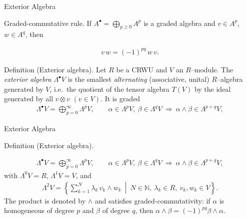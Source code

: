 
\date{24 October 2025}



\begin{frame}
  \cmctitleframe
\end{frame}

\begin{frame}{Exterior Algebra}

\begin{block}{Graded-commutative rule.} If $A^\bullet=\bigoplus_{p\ge 0}A^p$ is a graded algebra and $v\in A^p$, $w\in A^q$, then

\begin{align*}
v\,w = (-1)^{pq}\,w\,v.
\end{align*}
\end{block}

\vspace{-0.3cm}
\begin{block}{Definition (Exterior algebra).}
Let $R$ be a CRWU and $V$ an $R$–module. The \emph{exterior algebra} $\Lambda^\bullet V$ is the smallest \emph{alternating} (associative, unital) $R$–algebra generated by $V$, i.e.\ the quotient of the tensor algebra $T(V)$ by the ideal generated by all $v\otimes v$ $(v\in V)$.
It is graded
\begin{align*}
\Lambda^\bullet V=\bigoplus_{p=0}^\infty \Lambda^p V,\qquad
\alpha\in\Lambda^p V,\ \beta\in\Lambda^q V \ \Longrightarrow\ \alpha\wedge\beta\in\Lambda^{p+q}V,
\end{align*}

\end{block}
\end{frame}

\begin{frame}{Exterior Algebra}

\begin{block}{Definition (Exterior algebra).}
\vspace{-0.3cm}

\begin{align*}
\Lambda^\bullet V=\bigoplus_{p=0}^\infty \Lambda^p V,\qquad
\alpha\in\Lambda^p V,\ \beta\in\Lambda^q V \ \Longrightarrow\ \alpha\wedge\beta\in\Lambda^{p+q}V,
\end{align*}
with $\Lambda^0V=R$, $\Lambda^1V=V$, and
\begin{align*}
\Lambda^2V=\left\{\sum_{k=1}^N \lambda_k\, v_k\wedge w_k \ \middle|\ N\in\mathbb{N},\ \lambda_k\in R,\ v_k,w_k\in V \right\}.
\end{align*}
The product is denoted by $\wedge$ and satisfies graded-commutativity: if $\alpha$ is homogeneous of degree $p$ and $\beta$ of degree $q$, then $\alpha\wedge\beta=(-1)^{pq}\beta\wedge\alpha$.
\end{block}
\end{frame}

